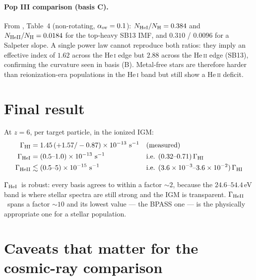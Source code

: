 \documentclass[11pt,a4paper]{article}
\newcommand{\GHI}{\ensuremath{\Gamma_{\rm HI}}}
\newcommand{\GHeI}{\ensuremath{\Gamma_{\rm HeI}}}
\newcommand{\GHeII}{\ensuremath{\Gamma_{\rm HeII}}}
\begin{document}
\paragraph{Pop III comparison (basis C).}
From \citet{Murphy2021}, Table~4 (non-rotating, $\alpha_{\rm ov}=0.1$):
$N_{\rm HeI}/N_{\rm H} = 0.384$ and $N_{\rm HeII}/N_{\rm H} = 0.0184$ for the
top-heavy SB13 IMF, and $0.310$ / $0.0096$ for a Salpeter slope.  A single
power law cannot reproduce both ratios: they imply an effective index of
$1.62$ across the He\,\textsc{i} edge but $2.88$ across the He\,\textsc{ii}
edge (SB13), confirming the curvature seen in basis (B).  Metal-free stars are
therefore harder than reionization-era populations in the He\,\textsc{i} band
but still show a He\,\textsc{ii} deficit.

\section{Final result}

At $z=6$, per target particle, in the ionized IGM:
\begin{align*}
  \GHI   &= 1.45\,(+1.57/-0.87)\times10^{-13}\ {\rm s^{-1}}
            &&\text{(measured)}\\
  \GHeI  &= (0.5\text{--}1.0)\times10^{-13}\ {\rm s^{-1}}
            &&\text{i.e. } (0.32\text{--}0.71)\,\GHI\\
  \GHeII &\lesssim (0.5\text{--}5)\times10^{-15}\ {\rm s^{-1}}
            &&\text{i.e. } (3.6\times10^{-3}\text{--}3.6\times10^{-2})\,\GHI
\end{align*}

\GHeI\ is robust: every basis agrees to within a factor $\sim2$, because the
$24.6$--$54.4\,$eV band is where stellar spectra are still strong and the IGM
is transparent.  \GHeII\ spans a factor $\sim10$ and its lowest value --- the
BPASS one --- is the physically appropriate one for a stellar population.

\section{Caveats that matter for the cosmic-ray comparison}
\label{sec:caveats}
\end{document}
